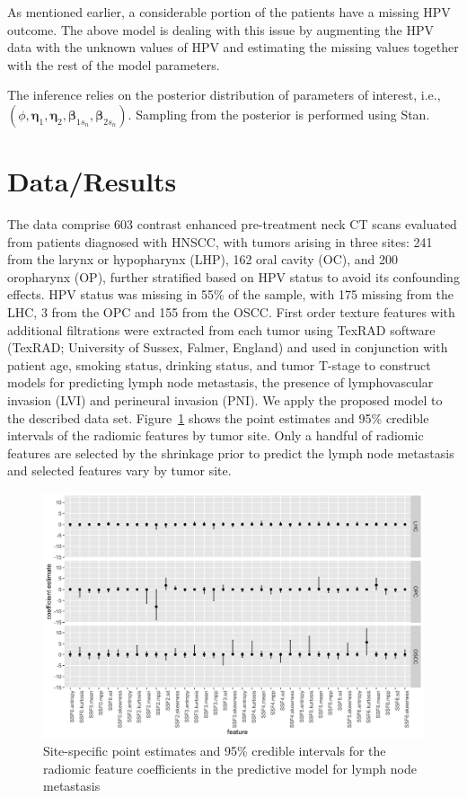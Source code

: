 \documentclass[10pt]{article}
\begin{document}
As mentioned earlier, a considerable portion of the patients have a missing HPV outcome. The above model is dealing with this issue by augmenting the HPV data with the unknown values of HPV and estimating the missing values together with the rest of the model parameters. 

The inference relies on the posterior distribution of parameters of interest, i.e., $(\phi, \boldsymbol{\eta}_1, \boldsymbol{\eta}_2, \boldsymbol{\beta}_{1s_n}, \boldsymbol{\beta}_{2s_n})$. Sampling from the posterior is performed using Stan.

\section{Data/Results}

The data comprise 603 contrast enhanced pre-treatment neck CT scans evaluated from patients diagnosed with HNSCC, with tumors arising in three sites: 241 from the larynx or hypopharynx (LHP), 162 oral cavity (OC), and 200 oropharynx (OP), further stratified based on HPV status to avoid its confounding effects. HPV status was missing in 55\% of the sample, with 175 missing from the LHC, 3 from the OPC and 155 from the OSCC. First order texture features with additional filtrations were extracted from each tumor using TexRAD software (TexRAD; University of Sussex, Falmer, England) and used in conjunction with patient age, smoking status, drinking status, and tumor T-stage to construct models for predicting lymph node metastasis, the presence of lymphovascular invasion (LVI) and perineural invasion (PNI).
We apply the proposed model to the described data set. Figure~\ref{fig1} shows the point estimates and 95\% credible intervals of the radiomic features by tumor site. Only a handful of radiomic features are selected by the shrinkage prior to predict the lymph node metastasis and selected features vary by tumor site. 

\begin{figure}[htbp]
	\begin{center}
		\centerline{\includegraphics[width=\columnwidth]{mv_NS_feat.png}}
		\caption{Site-specific point estimates and 95\% credible intervals for the radiomic feature coefficients in the predictive model for lymph node metastasis}
		\label{fig1}
	\end{center}
\end{figure}
\end{document}
